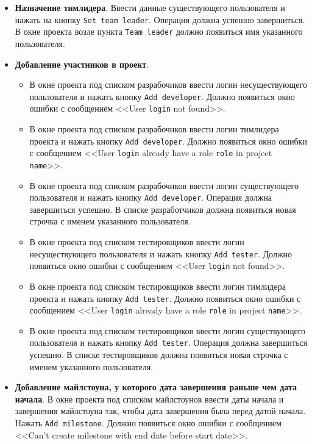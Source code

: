 \begin{itemize}
	\item \textbf{Назначение тимлидера}. Ввести данные существующего пользователя и нажать на кнопку \texttt{Set team leader}. Операция должна успешно завершиться. В окне проекта возле пункта \texttt{Team leader} должно появиться имя указанного пользователя.
	
	\item \textbf{Добавление участников в проект}.
	\begin{itemize}
		\item В окне проекта под списком разрабочиков ввести логин несуществующего пользователя и нажать кнопку \texttt{Add developer}. Должно появиться окно ошибки с сообщением <<User \texttt{login} not found>>.
		\item В окне проекта под списком разрабочиков ввести логин тимлидера проекта и нажать кнопку \texttt{Add developer}. Должно появиться окно ошибки с сообщением <<User \texttt{login} already have a role \texttt{role} in project \texttt{name}>>.
		\item В окне проекта под списком разрабочиков ввести логин существующего пользователя и нажать кнопку \texttt{Add developer}. Операция должна завершиться успешно. В списке разработчиков должна появиться новая строчка с именем указанного пользователя.
		\item В окне проекта под списком тестировщиков ввести логин несуществующего пользователя и нажать кнопку \texttt{Add tester}. Должно появиться окно ошибки с сообщением <<User \texttt{login} not found>>.
		\item В окне проекта под списком тестировщиков ввести логин тимлидера проекта и нажать кнопку \texttt{Add tester}. Должно появиться окно ошибки с сообщением <<User \texttt{login} already have a role \texttt{role} in project \texttt{name}>>.
		\item В окне проекта под списком тестировщиков ввести логин существующего пользователя и нажать кнопку \texttt{Add tester}. Операция должна завершиться успешно. В списке тестировщиков должна появиться новая строчка с именем указанного пользователя.
	\end{itemize}
	
	\item \textbf{Добавление майлстоуна, у которого дата завершения раньше чем дата начала}. В окне проекта под списком майлстоунов ввести даты начала и завершения майлстоуна так, чтобы дата завершения была перед датой начала. Нажать \texttt{Add milestone}. Должно появиться окно ошибки с сообщением <<Can't create milestone with end date before start date>>.
	

\end{itemize}
